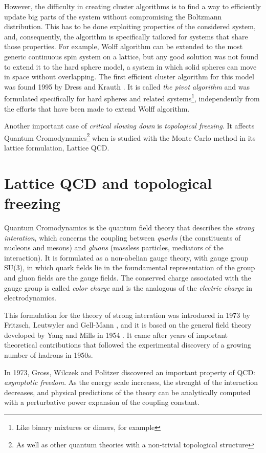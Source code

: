 However, the difficulty in creating cluster algorithms is to find a way to efficiently update big parts of the system without compromising the Boltzmann distribution.
This has to be done exploiting properties of the considered system, and, consequently, the algorithm is specifically tailored for systems that share those properties.
For example, Wolff algorithm can be extended to the most generic continuous spin system on a lattice,
but any good solution was not found to extend it to the hard sphere model,
\ie a system in which solid spheres can move in space without overlapping.
The first efficient cluster algorithm for this model was found 1995 by Dress and Krauth \cite{dress-krauth:1995}.
It is called \emph{the pivot algorithm} and was formulated specifically for hard spheres and related systems\footnote{Like binary mixtures or dimers, for example},
independently from the efforts that have been made to extend Wolff algorithm.

Another important case of \emph{critical slowing down} is \emph{topological freezing}.
It affects Quantum Cromodynamics\footnote{As well as other quantum theories with a non-trivial topological structure}
when is studied with the Monte Carlo method in its lattice formulation, \ie Lattice QCD.

\section*{Lattice QCD and topological freezing}
Quantum Cromodynamics is the quantum field theory that describes the \emph{strong interation},
which concerns the coupling between \emph{quarks} (the constituents of nucleons and mesons) and \emph{gluons} (massless particles, mediators of the interaction).
It is formulated as a non-abelian gauge theory, with gauge group SU(3),
in which quark fields lie in the foundamental representation of the group and gluon fields are the gauge fields.
The conserved charge associated with the gauge group is called \emph{color charge} and is the analogous of the \emph{electric charge} in electrodynamics.

This formulation for the theory of strong interation was introduced in 1973 by Fritzsch, Leutwyler and Gell-Mann \cite{fritzsch:1973},
and it is based on the general field theory developed by Yang and Mills in 1954 \cite{yang-mills:1954}.
It came after years of important theoretical contributions that followed the experimental discovery of a growing number of hadrons in 1950s.

In 1973, Gross, Wilczek \cite{gross-wilczek:1973} and Politzer \cite{politzer:1973} discovered an important property of QCD: \emph{asymptotic freedom}.
As the energy scale increases, the strenght of the interaction decreases,
and physical predictions of the theory can be analytically computed with a perturbative power expansion of the coupling constant.

